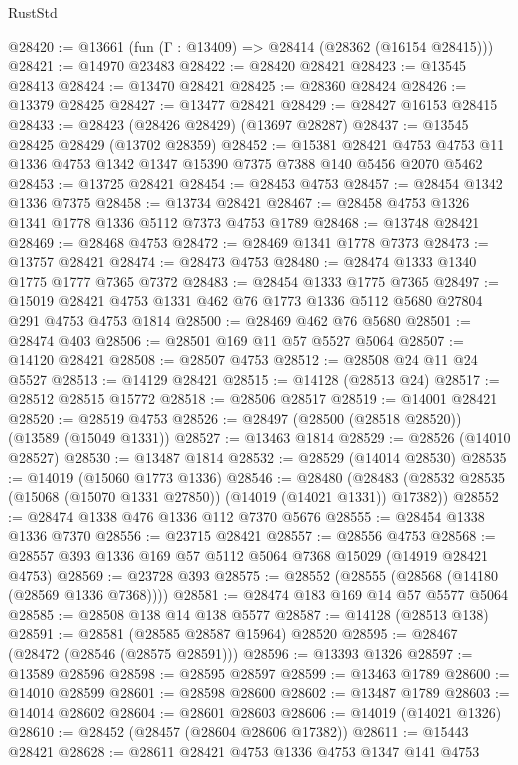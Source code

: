 \begin{lexlean}{RustStd}
\begin{coremodule}
@28420 := @13661 (fun (Γ : @13409) => @28414 (@28362 (@16154 @28415)))
@28421 := @14970 @23483
@28422 := @28420 @28421
@28423 := @13545 @28413
@28424 := @13470 @28421
@28425 := @28360 @28424
@28426 := @13379 @28425
@28427 := @13477 @28421
@28429 := @28427 @16153 @28415
@28433 := @28423 (@28426 @28429) (@13697 @28287)
@28437 := @13545 @28425 @28429 (@13702 @28359)
@28452 := @15381
    @28421
    @4753
    @4753
    @11
    @1336
    @4753
    @1342
    @1347
    @15390
    @7375
    @7388
    @140
    @5456
    @2070
    @5462
@28453 := @13725 @28421
@28454 := @28453 @4753
@28457 := @28454 @1342 @1336 @7375
@28458 := @13734 @28421
@28467 := @28458 @4753 @1326 @1341 @1778 @1336 @5112 @7373 @4753 @1789
@28468 := @13748 @28421
@28469 := @28468 @4753
@28472 := @28469 @1341 @1778 @7373
@28473 := @13757 @28421
@28474 := @28473 @4753
@28480 := @28474 @1333 @1340 @1775 @1777 @7365 @7372
@28483 := @28454 @1333 @1775 @7365
@28497 := @15019 @28421 @4753 @1331 @462 @76 @1773 @1336 @5112 @5680 @27804 @291 @4753 @4753 @1814
@28500 := @28469 @462 @76 @5680
@28501 := @28474 @403
@28506 := @28501 @169 @11 @57 @5527 @5064
@28507 := @14120 @28421
@28508 := @28507 @4753
@28512 := @28508 @24 @11 @24 @5527
@28513 := @14129 @28421
@28515 := @14128 (@28513 @24)
@28517 := @28512 @28515 @15772
@28518 := @28506 @28517
@28519 := @14001 @28421
@28520 := @28519 @4753
@28526 := @28497 (@28500 (@28518 @28520)) (@13589 (@15049 @1331))
@28527 := @13463 @1814
@28529 := @28526 (@14010 @28527)
@28530 := @13487 @1814
@28532 := @28529 (@14014 @28530)
@28535 := @14019 (@15060 @1773 @1336)
@28546 := @28480
    (@28483 (@28532 @28535 (@15068 (@15070 @1331 @27850)) (@14019 (@14021 @1331)) @17382))
@28552 := @28474 @1338 @476 @1336 @112 @7370 @5676
@28555 := @28454 @1338 @1336 @7370
@28556 := @23715 @28421
@28557 := @28556 @4753
@28568 := @28557 @393 @1336 @169 @57 @5112 @5064 @7368 @15029 (@14919 @28421 @4753)
@28569 := @23728 @393
@28575 := @28552 (@28555 (@28568 (@14180 (@28569 @1336 @7368))))
@28581 := @28474 @183 @169 @14 @57 @5577 @5064
@28585 := @28508 @138 @14 @138 @5577
@28587 := @14128 (@28513 @138)
@28591 := @28581 (@28585 @28587 @15964) @28520
@28595 := @28467 (@28472 (@28546 (@28575 @28591)))
@28596 := @13393 @1326
@28597 := @13589 @28596
@28598 := @28595 @28597
@28599 := @13463 @1789
@28600 := @14010 @28599
@28601 := @28598 @28600
@28602 := @13487 @1789
@28603 := @14014 @28602
@28604 := @28601 @28603
@28606 := @14019 (@14021 @1326)
@28610 := @28452 (@28457 (@28604 @28606 @17382))
@28611 := @15443 @28421
@28628 := @28611
    @28421
    @4753
    @1336
    @4753
    @1347
    @141
    @4753

\end{coremodule}
\end{lexlean}
